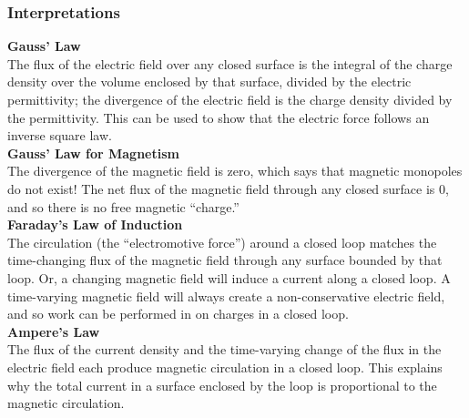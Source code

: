 \subsubsection{Interpretations}

\textbf{Gauss' Law} \\

The flux of the electric field over any closed surface is the integral of the charge density over the volume enclosed by that surface, divided by the electric permittivity; the divergence of the electric field is the charge density divided by the permittivity. This can be used to show that the electric force follows an inverse square law. \\

\textbf{Gauss' Law for Magnetism} \\

The divergence of the magnetic field is zero, which says that magnetic monopoles do not exist! The net flux of the magnetic field through any closed surface is 0, and so there is no free magnetic “charge.” \\

\textbf{Faraday's Law of Induction} \\

The circulation (the “electromotive force”) around a closed loop matches the time-changing flux of the magnetic field through any surface bounded by that loop. Or, a changing magnetic field will induce a current along a closed loop. A time-varying magnetic field will always create a non-conservative electric field, and so work can be performed in on charges in a closed loop. \\

\textbf{Ampere's Law} \\

The flux of the current density and the time-varying change of the flux in the electric field each produce magnetic circulation in a closed loop. This explains why the total current in a surface enclosed by the loop is proportional to the magnetic circulation.



